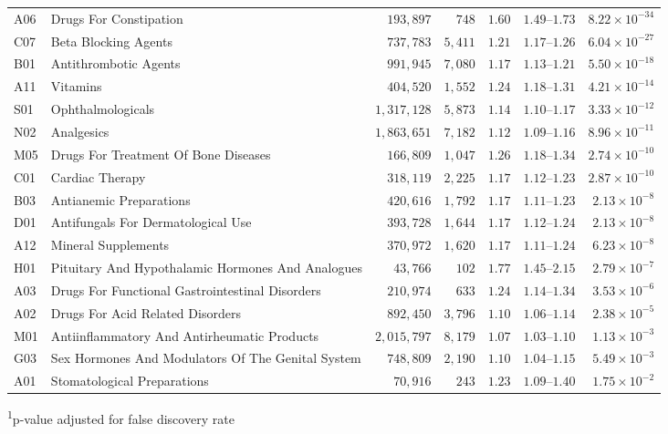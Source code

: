 \begin{longtable}{llrrrrr}
A06 & Drugs For Constipation & $193,897$ & $748$ & $1.60$ & $1.49$–$1.73$ & $8.22 \times 10^{-34}$ \\ 
C07 & Beta Blocking Agents & $737,783$ & $5,411$ & $1.21$ & $1.17$–$1.26$ & $6.04 \times 10^{-27}$ \\ 
B01 & Antithrombotic Agents & $991,945$ & $7,080$ & $1.17$ & $1.13$–$1.21$ & $5.50 \times 10^{-18}$ \\ 
A11 & Vitamins & $404,520$ & $1,552$ & $1.24$ & $1.18$–$1.31$ & $4.21 \times 10^{-14}$ \\ 
S01 & Ophthalmologicals & $1,317,128$ & $5,873$ & $1.14$ & $1.10$–$1.17$ & $3.33 \times 10^{-12}$ \\ 
N02 & Analgesics & $1,863,651$ & $7,182$ & $1.12$ & $1.09$–$1.16$ & $8.96 \times 10^{-11}$ \\ 
M05 & Drugs For Treatment Of Bone Diseases & $166,809$ & $1,047$ & $1.26$ & $1.18$–$1.34$ & $2.74 \times 10^{-10}$ \\ 
C01 & Cardiac Therapy & $318,119$ & $2,225$ & $1.17$ & $1.12$–$1.23$ & $2.87 \times 10^{-10}$ \\ 
B03 & Antianemic Preparations & $420,616$ & $1,792$ & $1.17$ & $1.11$–$1.23$ & $2.13 \times 10^{-8}$ \\ 
D01 & Antifungals For Dermatological Use & $393,728$ & $1,644$ & $1.17$ & $1.12$–$1.24$ & $2.13 \times 10^{-8}$ \\ 
A12 & Mineral Supplements & $370,972$ & $1,620$ & $1.17$ & $1.11$–$1.24$ & $6.23 \times 10^{-8}$ \\ 
H01 & Pituitary And Hypothalamic Hormones And Analogues & $43,766$ & $102$ & $1.77$ & $1.45$–$2.15$ & $2.79 \times 10^{-7}$ \\ 
A03 & Drugs For Functional Gastrointestinal Disorders & $210,974$ & $633$ & $1.24$ & $1.14$–$1.34$ & $3.53 \times 10^{-6}$ \\ 
A02 & Drugs For Acid Related Disorders & $892,450$ & $3,796$ & $1.10$ & $1.06$–$1.14$ & $2.38 \times 10^{-5}$ \\ 
M01 & Antiinflammatory And Antirheumatic Products & $2,015,797$ & $8,179$ & $1.07$ & $1.03$–$1.10$ & $1.13 \times 10^{-3}$ \\ 
G03 & Sex Hormones And Modulators Of The Genital System & $748,809$ & $2,190$ & $1.10$ & $1.04$–$1.15$ & $5.49 \times 10^{-3}$ \\ 
A01 & Stomatological Preparations & $70,916$ & $243$ & $1.23$ & $1.09$–$1.40$ & $1.75 \times 10^{-2}$ \\ 
\bottomrule
\end{longtable}
\begin{minipage}{\linewidth}
\textsuperscript{1}p-value adjusted for false discovery rate\\
\end{minipage}

